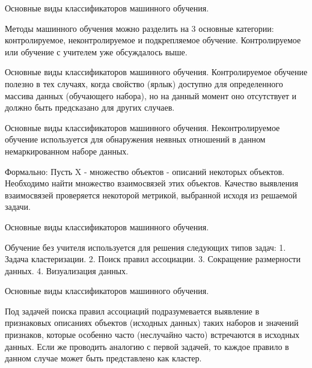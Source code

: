 \documentclass{beamer}
\begin{document}
\begin{frame}{Основные виды классификаторов машинного обучения.}

Методы машинного обучения можно разделить на 3 основные категории: контролируемое, 
неконтролируемое и подкрепляемое обучение. Контролируемое или обучение с учителем  уже обсуждалось выше.

\end{frame}


\begin{frame}{Основные виды классификаторов машинного обучения.}
Контролируемое обучение полезно в тех случаях, когда свойство (ярлык) доступно для определенного массива данных (обучающего набора), но на данный момент оно отсутствует и должно быть предсказано для других случаев. 
\end{frame}


\begin{frame}{Основные виды классификаторов машинного обучения.}
Неконтролируемое обучение используется для обнаружения неявных отношений в данном немаркированном наборе данных. 

Формально:
Пусть X - множество объектов  - описаний некоторых
объектов. Необходимо найти множество  взаимосвязей этих объектов.
Качество выявления взаимосвязей проверяется некоторой метрикой,
выбранной исходя из решаемой задачи.

\end{frame}


\begin{frame}{Основные виды классификаторов машинного обучения.}


Обучение без учителя используется для решения следующих
типов задач:
1. Задача кластеризации.
2. Поиск правил ассоциации.
3. Сокращение размерности данных.
4. Визуализация данных.

\end{frame}



\begin{frame}{Основные виды классификаторов машинного обучения.}

Под задачей поиска правил ассоциаций подразумевается
выявление в признаковых описаниях объектов (исходных данных)
таких наборов и значений признаков, которые особенно часто
(неслучайно часто) встречаются в исходных данных. Если же
проводить аналогию с первой задачей, то каждое правило в данном
случае может быть представлено как кластер.

\end{frame}
\end{document}
